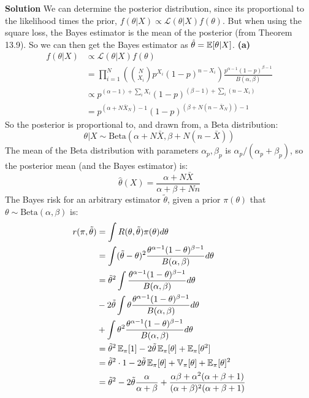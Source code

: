 \textbf{Solution}
We can determine the posterior distribution, since its proportional to
the likelihood times the prior,
\(f(\theta | X) \propto \mathcal{L}(\theta | X) f(\theta)\). But when
using the square loss, the Bayes estimator is the mean of the posterior
(from Theorem 13.9). So we can then get the Bayes estimator as
\(\hat{\theta} = \operatorname{\mathbb{E}}[\theta | X]\).
\textbf{(a)}
\begin{align*}
f(\theta | X) &\propto \mathcal{L}(\theta | X) f(\theta) \\
&= \prod_{i = 1}^N \left( \binom{N}{X_{i}} p^{X_{i}}(1 - p)^{n - X_{i}} \right) \frac{p^{\alpha - 1}(1-p)^{\beta - 1}}{B(\alpha, \beta)} \\
& \propto p^{(\alpha - 1) + \sum_{i} X_{i}} (1 - p)^{(\beta - 1) + \sum_{i} (n - X_{i})} \\
&= p^{\left(\alpha + N \bar{X}_N \right) - 1} (1 - p)^{\left(\beta + N(n - \bar{X}_N) \right)- 1}
\end{align*}
So the posterior is proportional to, and drawn from, a Beta
distribution:
\[
\theta | X \sim \text{Beta}\left(\alpha + N \bar{X}, \beta + N(n - \bar{X}) \right)
\]
The mean of the Beta distribution with parameters \(\alpha_p, \beta_p\)
is \(\alpha_p / (\alpha_p + \beta_p)\), so the posterior mean (and the
Bayes estimator) is:
\[
\hat{\theta}(X) = \frac{\alpha + N \bar{X}}{\alpha + \beta + Nn}
\]
The Bayes risk for an arbitrary estimator \(\tilde{\theta}\), given a
prior \(\pi(\theta)\) that \(\theta \sim \text{Beta}(\alpha, \beta)\)
is:
\begin{align*}
r(\pi, \tilde{\theta}) 
&= \int R(\theta, \tilde{\theta}) \pi(\theta) d\theta 
\\
&= \int (\tilde{\theta} - \theta)^{2} \frac{\theta^{\alpha - 1}(1 - \theta)^{\beta - 1}}{B(\alpha, \beta)} d\theta 
\\
&= \tilde{\theta}^{2} \int \frac{\theta^{\alpha - 1}(1 - \theta)^{\beta - 1}}{B(\alpha, \beta)} d\theta
\\
&- 2 \tilde{\theta} \int \theta \frac{\theta^{\alpha - 1}(1 - \theta)^{\beta - 1}}{B(\alpha, \beta)} d\theta
\\
&+ \int \theta^{2} \frac{\theta^{\alpha - 1}(1 - \theta)^{\beta - 1}}{B(\alpha, \beta)} d\theta 
\\
&= \tilde{\theta}^{2} \operatorname{\mathbb{E}}_\pi[1] - 2 \tilde{\theta} \operatorname{\mathbb{E}}_\pi[\theta] + \operatorname{\mathbb{E}}_\pi[\theta^{2}]
\\
&= \tilde{\theta}^{2} \cdot 1 - 2 \tilde{\theta} \operatorname{\mathbb{E}}_\pi[\theta] + \operatorname{\mathbb{V}}_\pi[\theta] + \operatorname{\mathbb{E}}_\pi[\theta]^{2} 
\\ 
&= \tilde{\theta}^{2} - 2 \tilde{\theta} \frac{\alpha}{\alpha + \beta}
+ \frac{\alpha\beta + \alpha^{2}(\alpha + \beta + 1)}{(\alpha + \beta)^{2}(\alpha + \beta + 1)}
\end{align*}
